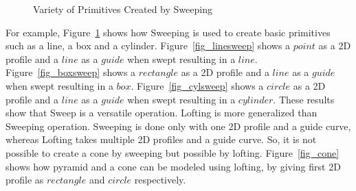 
	\begin{figure}[!h]
	\centering     %
	\quad
	\quad
	\caption{Variety of Primitives Created by Sweeping} %
	\label{fig_sweptsolids}
	\end{figure}
	



For example, Figure~\ref{fig_sweptsolids} shows how Sweeping is used to create basic primitives such as a line, a box and a cylinder. Figure~\ref{fig_linesweep} shows a $point$ as a 2D profile and a $line$ as a $guide$ when swept resulting in a $line$. Figure~\ref{fig_boxsweep} shows a $rectangle$ as a 2D profile and a $line$ as a $guide$ when swept resulting in a $box$.  Figure~\ref{fig_cylsweep} shows a $circle$ as a 2D profile and a $line$ as a $guide$ when swept resulting in a $cylinder$. These results show that Sweep is a versatile operation. Lofting is more generalized than Sweeping operation. Sweeping is done only with one 2D profile and a guide curve, whereas Lofting takes multiple 2D profiles and a guide curve. So, it is not possible to create a cone by sweeping but possible by lofting. Figure~\ref{fig_cone} shows how pyramid and a cone can be modeled using lofting, by giving first 2D profile as $rectangle$ and $circle$ respectively. 

